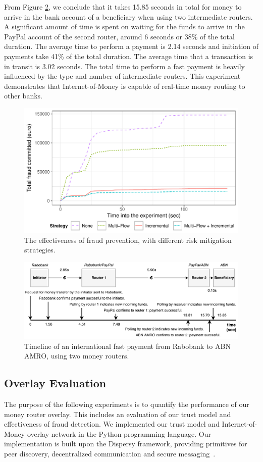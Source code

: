From Figure \ref{fig:speedball_experiment}, we conclude that it takes 15.85 seconds in total for money to arrive in the bank account of a beneficiary when using two intermediate routers.
A significant amount of time is spent on waiting for the funds to arrive in the PayPal account of the second router, around 6 seconds or 38\% of the total duration.
The average time to perform a payment is 2.14 seconds and initiation of payments take 41\% of the total duration.
The average time that a transaction is in transit is 3.02 seconds.
The total time to perform a fast payment is heavily influenced by the type and number of intermediate routers.
This experiment demonstrates that Internet-of-Money is capable of real-time money routing to other banks.

\begin{figure}[!t]
	\centering
	\includegraphics[width=.7\linewidth]{iom/assets/fraud_experiment}
	\caption{The effectiveness of fraud prevention, with different risk mitigation strategies.}
	\label{fig:fraud_experiment}
\end{figure}

\begin{figure}[t]
	\centering
	\includegraphics[width=0.84\linewidth]{iom/assets/speedball}
	\caption{Timeline of an international fast payment from Rabobank to ABN AMRO, using two money routers.}
	\label{fig:speedball_experiment}
\end{figure}

\subsection{Overlay Evaluation}
The purpose of the following experiments is to quantify the performance of our money router overlay.
This includes an evaluation of our trust model and effectiveness of fraud detection.
We implemented our trust model and Internet-of-Money overlay network in the Python programming language.
Our implementation is built upon the Dispersy framework, providing primitives for peer discovery, decentralized communication and secure messaging~\cite{zeilemaker2013dispersy}.

